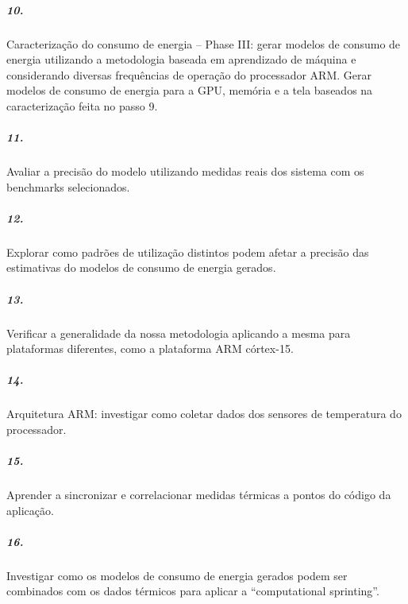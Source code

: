 \documentclass[11pt,a4paper,titlepage]{article}
\begin{document}
\subparagraph{10.} Caracterização do consumo de energia – Phase III: gerar modelos de consumo de energia utilizando a metodologia baseada em aprendizado de máquina e considerando diversas frequências de operação do processador ARM. Gerar modelos de consumo de energia para a GPU, memória e a tela baseados na caracterização feita no passo 9. \\
\subparagraph{11.} Avaliar a precisão do modelo utilizando medidas reais dos sistema com os benchmarks selecionados. \\
\subparagraph{12.} Explorar como padrões de utilização distintos podem afetar a precisão das estimativas do modelos de consumo de energia gerados. 
\subparagraph{13.} Verificar a generalidade da nossa metodologia aplicando a mesma para plataformas diferentes, como a plataforma ARM córtex-15. \\
\subparagraph{14.} Arquitetura ARM: investigar como coletar dados dos sensores de temperatura do processador. \\
\subparagraph{15.} Aprender a sincronizar e correlacionar medidas térmicas a pontos do código da aplicação. \\
\subparagraph{16.} Investigar como os modelos de consumo de energia gerados podem ser combinados com os dados térmicos para aplicar a “computational sprinting”.\\\\
\end{document}
